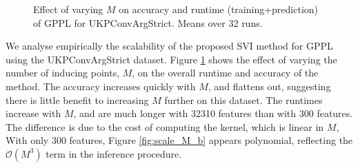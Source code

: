 \begin{figure}[h]
\caption{Effect of varying $M$ on accuracy and runtime (training+prediction) of GPPL for UKPConvArgStrict.  Means over 32 runs.}
\label{fig:scale_M}
\end{figure}
We analyse empirically the scalability of the proposed SVI method for GPPL using the UKPConvArgStrict dataset.
Figure \ref{fig:scale_M} shows the effect of varying the number of inducing points, $M$, on the overall runtime and accuracy of the method. The accuracy increases quickly with $M$, and flattens out, suggesting there is little benefit to increasing  $M$ further on this dataset. 
The runtimes 
increase with $M$,  and are much longer with 32310 features than with 300 features.
The difference is due to the cost of computing the kernel, which is linear in $M$,
With only $300$ features, Figure \ref{fig:scale_M_b} appears polynomial, reflecting the $\mathcal{O}(M^3)$ term in the inference procedure. 
 
